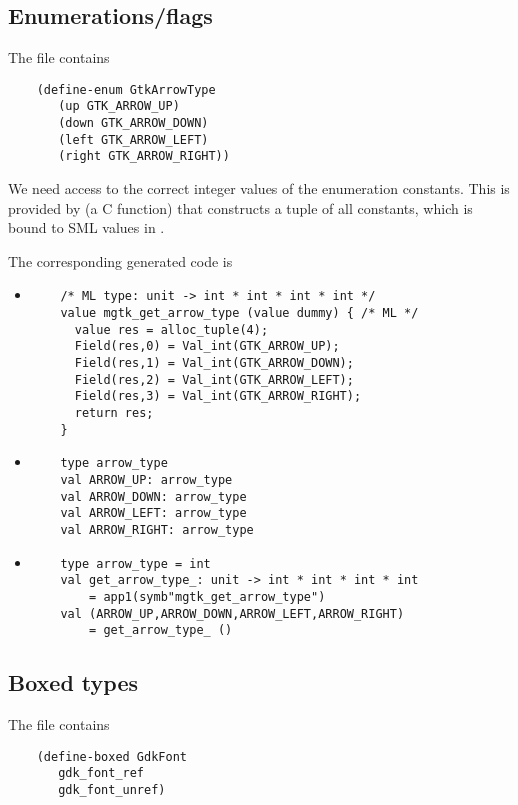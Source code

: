 \documentclass{article}
\begin{document}
\subsection{Enumerations/flags}

The  file contains
\begin{verbatim}
    (define-enum GtkArrowType
       (up GTK_ARROW_UP)
       (down GTK_ARROW_DOWN)
       (left GTK_ARROW_LEFT)
       (right GTK_ARROW_RIGHT))
\end{verbatim}

We need access to the correct integer values of the enumeration
constants. This is provided by  (a C
function) that constructs a tuple of all constants, which is bound to
SML values in .

The corresponding generated code is
\begin{itemize}
\item {}
\begin{verbatim}
    /* ML type: unit -> int * int * int * int */
    value mgtk_get_arrow_type (value dummy) { /* ML */
      value res = alloc_tuple(4);
      Field(res,0) = Val_int(GTK_ARROW_UP);
      Field(res,1) = Val_int(GTK_ARROW_DOWN);
      Field(res,2) = Val_int(GTK_ARROW_LEFT);
      Field(res,3) = Val_int(GTK_ARROW_RIGHT);
      return res;
    }
\end{verbatim}

\item {}
\begin{verbatim}
    type arrow_type
    val ARROW_UP: arrow_type
    val ARROW_DOWN: arrow_type
    val ARROW_LEFT: arrow_type
    val ARROW_RIGHT: arrow_type
\end{verbatim}

\item {}
\begin{verbatim}
    type arrow_type = int
    val get_arrow_type_: unit -> int * int * int * int
        = app1(symb"mgtk_get_arrow_type")
    val (ARROW_UP,ARROW_DOWN,ARROW_LEFT,ARROW_RIGHT)
        = get_arrow_type_ ()
\end{verbatim}

\end{itemize}

\subsection{Boxed types}

The  file contains
\begin{verbatim}
    (define-boxed GdkFont
       gdk_font_ref
       gdk_font_unref)
\end{verbatim}
\end{document}
